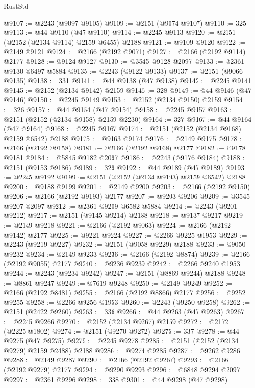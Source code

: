 \begin{lexlean}{RustStd}
\begin{coremodule}
@9107 := @2243 (@9097 @9105)
@9109 := @2151 (@9074 @9107)
@9110 := 325
@9113 := @44 @9110 (@47 @9110)
@9114 := @2245 @9113
@9120 := @2151 (@2152 (@2134 @9114) @2159 @6455) @2188
@9121 := @9109 @9120
@9122 := @2149 @9121
@9124 := @2166 (@2192 @9071)
@9127 := @2166 (@2192 @9114) @2177
@9128 := @9124 @9127
@9130 := @3545 @9128 @2097
@9133 := @2361 @9130 @6497 @5884
@9135 := @2243 (@9122 @9133)
@9137 := @2151 (@9066 @9135)
@9138 := 331
@9141 := @44 @9138 (@47 @9138)
@9142 := @2245 @9141
@9145 := @2152 (@2134 @9142) @2159
@9146 := 328
@9149 := @44 @9146 (@47 @9146)
@9150 := @2245 @9149
@9153 := @2152 (@2134 @9150) @2159
@9154 := 326
@9157 := @44 @9154 (@47 @9154)
@9158 := @2245 @9157
@9163 := @2151 (@2152 (@2134 @9158) @2159 @2230)
@9164 := 327
@9167 := @44 @9164 (@47 @9164)
@9168 := @2245 @9167
@9174 := @2151 (@2152 (@2134 @9168) @2159 @6542) @2188
@9175 := @9163 @9174
@9176 := @2149 @9175
@9178 := @2166 (@2192 @9158)
@9181 := @2166 (@2192 @9168) @2177
@9182 := @9178 @9181
@9184 := @5845 @9182 @2097
@9186 := @2243 (@9176 @9184)
@9188 := @2151 (@9153 @9186)
@9189 := 329
@9192 := @44 @9189 (@47 @9189)
@9193 := @2245 @9192
@9199 := @2151 (@2152 (@2134 @9193) @2159 @6542) @2188
@9200 := @9188 @9199
@9201 := @2149 @9200
@9203 := @2166 (@2192 @9150)
@9206 := @2166 (@2192 @9193) @2177
@9207 := @9203 @9206
@9209 := @3545 @9207 @2097
@9212 := @2361 @9209 @6582 @5884
@9214 := @2243 (@9201 @9212)
@9217 := @2151 (@9145 @9214) @2188
@9218 := @9137 @9217
@9219 := @2149 @9218
@9221 := @2166 (@2192 @9063)
@9224 := @2166 (@2192 @9142) @2177
@9225 := @9221 @9224
@9227 := @2266 @9225 @1953
@9229 := @2243 (@9219 @9227)
@9232 := @2151 (@9058 @9229) @2188
@9233 := @9050 @9232
@9234 := @2149 @9233
@9236 := @2166 (@2192 @8874)
@9239 := @2166 (@2192 @9055) @2177
@9240 := @9236 @9239
@9242 := @2266 @9240 @1953
@9244 := @2243 (@9234 @9242)
@9247 := @2151 (@8869 @9244) @2188
@9248 := @8861 @9247
@9249 := @7619 @9248
@9250 := @2149 @9249
@9252 := @2166 (@2192 @8481)
@9255 := @2166 (@2192 @8866) @2177
@9256 := @9252 @9255
@9258 := @2266 @9256 @1953
@9260 := @2243 (@9250 @9258)
@9262 := @2151 (@2422 @9260)
@9263 := 336
@9266 := @44 @9263 (@47 @9263)
@9267 := @2245 @9266
@9270 := @2152 (@2134 @9267) @2159
@9272 := @2172 (@2225 @1802)
@9274 := @2151 (@9270 @9272)
@9275 := 337
@9278 := @44 @9275 (@47 @9275)
@9279 := @2245 @9278
@9285 := @2151 (@2152 (@2134 @9279) @2159 @2488) @2188
@9286 := @9274 @9285
@9287 := @9262 @9286
@9288 := @2149 @9287
@9290 := @2166 (@2192 @9267)
@9293 := @2166 (@2192 @9279) @2177
@9294 := @9290 @9293
@9296 := @6848 @9294 @2097
@9297 := @2361 @9296
@9298 := 338
@9301 := @44 @9298 (@47 @9298)

\end{coremodule}
\end{lexlean}
